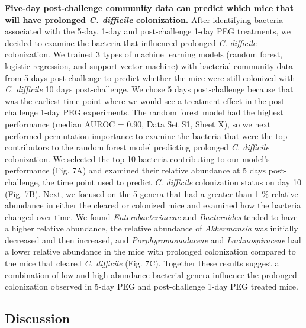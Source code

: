 \documentclass[
  11pt,
]{article}
\begin{document}
\textbf{Five-day post-challenge community data can predict which mice
that will have prolonged \emph{C. difficile} colonization.} After
identifying bacteria associated with the 5-day, 1-day and post-challenge
1-day PEG treatments, we decided to examine the bacteria that influenced
prolonged \emph{C. difficile} colonization. We trained 3 types of
machine learning models (random forest, logistic regression, and support
vector machine) with bacterial community data from 5 days post-challenge
to predict whether the mice were still colonized with \emph{C.
difficile} 10 days post-challenge. We chose 5 days post-challenge
because that was the earliest time point where we would see a treatment
effect in the post-challenge 1-day PEG experiments. The random forest
model had the highest performance (median AUROC = 0.90, Data Set S1,
Sheet X), so we next performed permutation importance to examine the
bacteria that were the top contributors to the random forest model
predicting prolonged \emph{C. difficile }colonization. We selected the
top 10 bacteria contributing to our model's performance (Fig. 7A) and
examined their relative abundance at 5 days post-challenge, the time
point used to predict \emph{C. difficile} colonization status on day 10
(Fig. 7B). Next, we focused on the 5 genera that had a greater than 1 \%
relative abundance in either the cleared or colonized mice and examined
how the bacteria changed over time. We found \emph{Enterobacteriaceae}
and \emph{Bacteroides} tended to have a higher relative abundance, the
relative abundance of \emph{Akkermansia} was initially decreased and
then increased, and \emph{Porphyromonadaceae} and \emph{Lachnospiraceae}
had a lower relative abundance in the mice with prolonged colonization
compared to the mice that cleared \emph{C. difficile} (Fig. 7C).
Together these results suggest a combination of low and high abundance
bacterial genera influence the prolonged colonization observed in 5-day
PEG and post-challenge 1-day PEG treated mice.

\hypertarget{discussion}{%
\subsection{Discussion}\label{discussion}}
\end{document}
